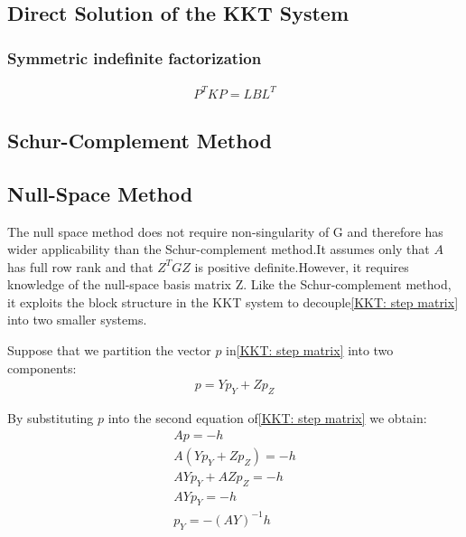     \subsection{Direct Solution of the KKT System} \label{subsec:-direct-solution-KKT}

    \subsubsection{Symmetric indefinite factorization} \label{subsubsec:-symmetric-indefinite-factorization}
    \begin{align}
        P^TKP = LBL^T \tag{16.12} \label{eqn: symmetric-indefinite-factorization}
    \end{align}

    \subsection{Schur-Complement Method} \label{subsec:-schur-complement-method}

    \subsection{Null-Space Method} \label{subsec:-null-space-method}
    \par The null space method does not require non-singularity of G and therefore has wider applicability than the
    Schur-complement method.It assumes only that $A$ has full row rank and that $Z^TGZ$ is positive definite.However,
    it requires knowledge of the null-space basis matrix Z. Like the Schur-complement method, it exploits the block
    structure in the KKT system to decouple\eqref{KKT: step matrix} into two smaller systems.
    \par Suppose that we partition the vector $p$ in\eqref{KKT: step matrix} into two components:
    \begin{align}
        p = Yp_Y + Zp_Z \tag{16.17} \label{eqn: 16.17}
    \end{align}

    By substituting $p$ into the second equation of\eqref{KKT: step matrix} we obtain:
    \begin{align*}
        Ap = -h\\
        A(Yp_Y + Zp_Z) = -h\\
        AYp_Y + AZp_Z = -h\\
        AYp_Y = -h \tag{16.18} \label{eqn: 16.18}\\
        p_Y = -(AY)^{-1}h
    \end{align*}

